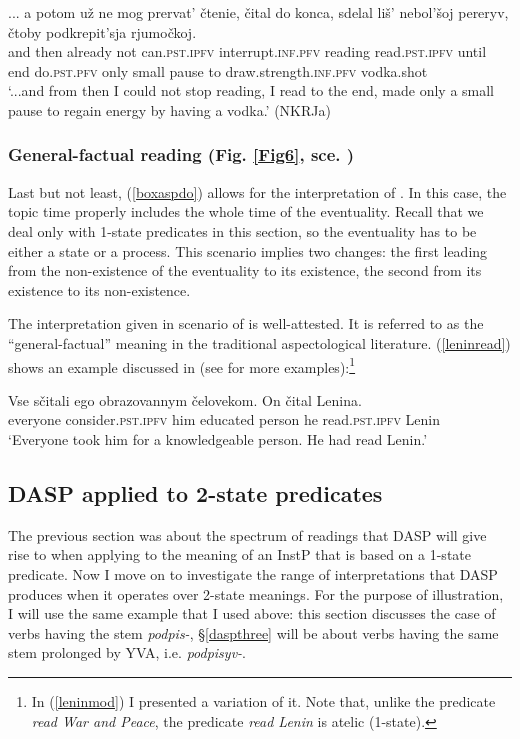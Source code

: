 \documentclass[output=paper,colorlinks,citecolor=brown]{langscibook}
\begin{document}
\ea\label{dokonca}
\gll ...
a potom  už ne mog prervat' čtenie, čital do konca, sdelal liš' nebol'šoj pereryv, čtoby podkrepit'sja rjumočkoj.\\
{} and then already 
not can.\textsc{pst.ipfv} interrupt.\textsc{inf.pfv} reading read.\textsc{pst.ipfv} until end 
do.\textsc{pst.pfv} only small pause to draw.strength.\textsc{inf.pfv} vodka.shot\\
\glt `...and from then I could not stop reading, I read to the end, made only a small pause to regain energy by having a vodka.' \hfill (NKRJa)
\z
 
\subsubsection{General-factual reading (Fig. \ref{Fig6}, sce. )}
Last but not least, (\ref{boxaspdo}) allows for the interpretation  of .
In this case, the topic time properly includes the whole time of the eventuality. 
Recall that we deal only with 1-state predicates in this section, so the eventuality has to be either a state or a process.  
This scenario implies two changes: the first leading from the non-existence of the eventuality to its existence, 
the second from its existence to its non-existence. 

The interpretation given in scenario  of  is well-attested.
It is referred to as the ``general-factual'' meaning 
in the traditional aspectological literature. (\ref{leninread}) shows an example discussed in \citet[343]{Paslawska.Stechow2003} (see \citealt[25]{zaliznjaksmelev97} for more examples):\footnote{In (\ref{leninmod}) I presented a variation of it. Note that, unlike the predicate \textit{read War and Peace}, the predicate \textit{read Lenin} is atelic (1-state).}

\ea\label{leninread}
\gll Vse sčitali ego obrazovannym čelovekom. On čital Lenina.  \\
everyone consider.\textsc{pst.ipfv} him 
educated person he  read.\textsc{pst.ipfv} Lenin\\
\glt `Everyone took him for a knowledgeable person. He had read Lenin.'
\z

\subsection{DASP applied to 2-state predicates}\label{dasptwo}

The previous section was about the spectrum of readings that DASP 
will give rise to when applying to the meaning of an InstP that is based on a 1-state predicate. Now I move on
to investigate the range of interpretations that DASP produces when it operates over 2-state meanings.  For the purpose of illustration, I will use the same example that I used above:
this section discusses the case of verbs having the stem \textit{podpis-},
\S \ref{daspthree} will be about verbs having the same stem prolonged by YVA, i.e. \textit{podpisyv-}. 
\end{document}
